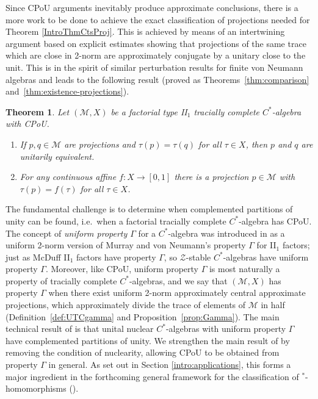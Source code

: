 \documentclass[a4paper,11pt]{amsart}
\newtheorem{theorem}{Theorem}
\theoremstyle{definition}
\numberwithin{equation}{section}
\numberwithin{theorem}{section}
\newcommand{\Z}{\mathcal Z}
\newcommand{\M}{\mathcal{M}}
\begin{document}
Since CPoU arguments inevitably produce approximate conclusions, there is a more work to be done to achieve the exact classification of projections needed for Theorem \ref{IntroThmCtsProj}.  This is achieved by means of an intertwining argument based on explicit estimates showing that projections of the same trace which are close in 2-norm are approximately conjugate by a unitary close to the unit. This is in the spirit of similar perturbation results for finite von Neumann algebras and leads to the following result (proved as Theorems~\ref{thm:comparison} and~\ref{thm:existence-projections}).

\begin{theorem}\label{introthm-classprojections2}
Let $(\M,X)$ be a factorial type {\rm II}$_1$ tracially complete $C^*$-algebra with CPoU. 
\begin{enumerate}
    \item\label{intro-class-proj-unique} If $p, q \in \mathcal M$ are projections and $\tau(p) = \tau(q)$ for all $\tau \in X$, then $p$ and $q$ are unitarily equivalent.
    \item\label{intro-class-proj-exist} For any continuous affine $f\colon X\to[0,1]$ there is a projection $p\in\M$ with $\tau(p)=f(\tau)$ for all $\tau\in X$.
\end{enumerate}
\end{theorem}


The fundamental challenge is to determine when complemented partitions of unity can be found, i.e.\ when a factorial tracially complete $C^*$-algebra has CPoU.  The concept of \emph{uniform property $\Gamma$} for a $C^*$-algebra was introduced in \cite{CETWW} as a uniform 2-norm version of Murray and von Neumann's property $\Gamma$ for II$_1$ factors; just as McDuff II$_1$ factors have property $\Gamma$, so $\Z$-stable $C^*$-algebras have uniform property $\Gamma$.  Moreover, like CPoU, uniform property $\Gamma$ is most naturally a property of tracially complete $C^*$-algebras, and we say that $(\M,X)$ has property $\Gamma$ when there exist uniform 2-norm approximately central approximate projections, which approximately divide the trace of elements of $\M$ in half (Definition~\ref{def:UTCgamma} and Proposition~\ref{prop:Gamma}). The main technical result of \cite{CETWW} is that unital nuclear $C^*$-algebras with uniform property $\Gamma$ have complemented partitions of unity.  We strengthen the main result of \cite{CETWW} by removing the condition of nuclearity, allowing CPoU to be obtained from property $\Gamma$ in general.  As set out in Section \ref{intro:applications}, this forms a major ingredient in the forthcoming general framework for the classification of $^*$-homomorphisms (\cite{CGSTW2}).  
\end{document}
